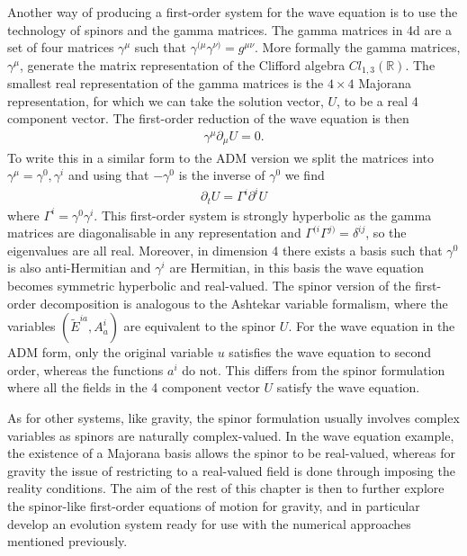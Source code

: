\documentclass[10pt]{report}
\theoremstyle{definition}
\newcommand{\R}[0]{\mathbb{R}}
\newcommand{\tE}[0]{\tilde{E}}
\begin{document}
    Another way of producing a first-order system for the wave equation is to use the technology of spinors and the gamma matrices. The gamma matrices in 4d are a set of four matrices $\gamma^\mu$ such that $\gamma^{(\mu} \gamma^{\nu)} = g^{\mu\nu}$. More formally the gamma matrices, $\gamma^\mu$, generate the matrix representation of the Clifford algebra $Cl_{1,3}(\R)$. The smallest real representation of the gamma matrices is the $4 \times 4$ Majorana representation, for which we can take the solution vector, $U$, to be a real 4 component vector. The first-order reduction of the wave equation is then
    \begin{align}
        \gamma^\mu \partial_\mu U = 0.
    \end{align}
    To write this in a similar form to the ADM version we split the matrices into $\gamma^\mu = \gamma^0, \gamma^i$ and using that $-\gamma^0$ is the inverse of $\gamma^0$ we find 
    \begin{align}
        \partial_t U = \Gamma^i \partial^i U
    \end{align}
    where $\Gamma^i = \gamma^0 \gamma^i$. This first-order system is strongly hyperbolic as the gamma matrices are diagonalisable in any representation and $\Gamma^{(i} \Gamma^{j)} = \delta^{ij}$, so the eigenvalues are all real. Moreover, in dimension 4 there exists a basis such that $\gamma^0$ is also anti-Hermitian and $\gamma^i$ are Hermitian, in this basis the wave equation becomes symmetric hyperbolic and real-valued. The spinor version of the first-order decomposition is analogous to the Ashtekar variable formalism, where the variables $(\tE^{ia}, A^i_a)$ are equivalent to the spinor $U$. For the wave equation in the ADM form, only the original variable $u$ satisfies the wave equation to second order, whereas the functions $a^i$ do not. This differs from the spinor formulation where all the fields in the 4 component vector $U$ satisfy the wave equation.

    As for other systems, like gravity, the spinor formulation usually involves complex variables as spinors are naturally complex-valued. In the wave equation example, the existence of a Majorana basis allows the spinor to be real-valued, whereas for gravity the issue of restricting to a real-valued field is done through imposing the reality conditions. The aim of the rest of this chapter is then to further explore the spinor-like first-order equations of motion for gravity, and in particular develop an evolution system ready for use with the numerical approaches mentioned previously.
\end{document}
